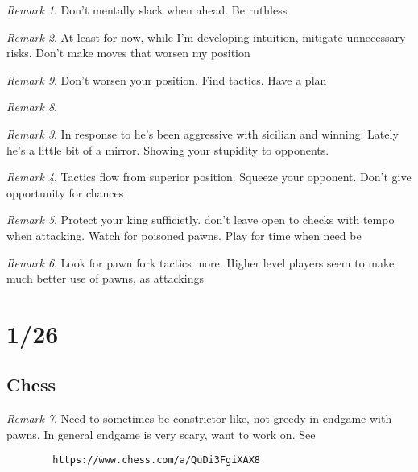 \documentclass[11pt]{article}
\theoremstyle{remark}
\newtheorem{remark}{Remark}
\begin{document}
\begin{remark}
	Don't mentally slack when ahead. Be ruthless
\end{remark}

\begin{remark}
	At least for now, while I'm developing intuition, mitigate unnecessary risks. Don't make moves that worsen my position
\end{remark}

\begin{remark}
	Don't worsen your position. Find tactics. Have a plan
\begin{remark}

\begin{remark}
	In response to he's been aggressive with sicilian and winning: Lately he's a little bit of a mirror. Showing your stupidity to opponents.
\end{remark}

\begin{remark}
	Tactics flow from superior position. Squeeze your opponent. Don't give opportunity for chances
\end{remark}

\begin{remark}
	Protect your king sufficietly. don't leave open to checks with tempo when attacking. Watch for poisoned pawns. Play for time when need be
\end{remark}

\begin{remark}
	Look for pawn fork tactics more. Higher level players seem to make much better use of pawns, as attackings
\end{remark}

\section{1/26}

\subsection{Chess}

\begin{remark}
	Need to sometimes be constrictor like, not greedy in endgame with pawns. In general endgame is very scary, want to work on. See
	\begin{verbatim}
		https://www.chess.com/a/QuDi3FgiXAX8
	\end{verbatim}
\end{remark}


\end{remark}
\end{remark}
\end{document}
